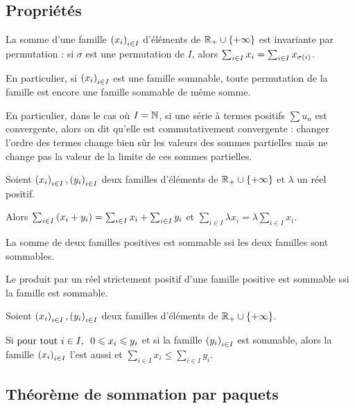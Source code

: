 \subsection{Propriétés}

\begin{prop}
La somme d'une famille \(\left(x_i\right)_{i\in I}\) d'éléments de \(\mathbb{R}_+\cup\left\lbrace+\infty\right\rbrace\) est invariante par permutation : si \(\sigma\) est une permutation de \(I\), alors \(\sum_{i\in I}x_i=\sum_{i\in I}x_{\sigma\left(i\right)}\).

En particulier, si \(\left(x_i\right)_{i\in I}\) est une famille sommable, toute permutation de la famille est encore une famille sommable de même somme.
\end{prop}

En particulier, dans le cas où \(I=\mathbb{N}\), si une série à termes positifs \(\sum u_n\) est convergente, alors on dit qu'elle est commutativement convergente : changer l'ordre des termes change bien sûr les valeurs des sommes partielles mais ne change pas la valeur de la limite de ces sommes partielles.

\begin{prop}
Soient \(\left(x_i\right)_{i\in I},\left(y_i\right)_{i\in I}\) deux familles d'éléments de \(\mathbb{R}_+\cup\left\lbrace+\infty\right\rbrace\) et \(\lambda\) un réel positif.

Alors \(\sum_{i\in I}\left(x_i+y_i\right)=\sum_{i\in I}x_i+\sum_{i\in I}y_i\) et \(\sum_{i\in I}\lambda x_i=\lambda\sum_{i\in I}x_i\).
\end{prop}

\begin{cor}
La somme de deux familles positives est sommable ssi les deux familles sont sommables.

Le produit par un réel strictement positif d'une famille positive est sommable ssi la famille est sommable.
\end{cor}

\begin{prop}
Soient \(\left(x_i\right)_{i\in I},\left(y_i\right)_{i\in I}\) deux familles d'éléments de \(\mathbb{R}_+\cup\left\lbrace+\infty\right\rbrace\).

Si \(\quantifs{\tpt i\in I}0\leq x_i\leq y_i\) et si la famille \(\left(y_i\right)_{i\in I}\) est sommable, alors la famille \(\left(x_i\right)_{i\in I}\) l'est aussi et \(\sum_{i\in I}x_i\leq\sum_{i\in I}y_i\).
\end{prop}

\subsection{Théorème de sommation par paquets}

